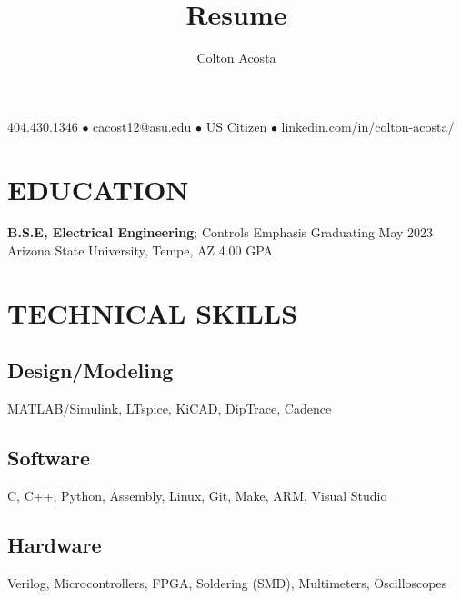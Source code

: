 \documentclass{article}
\makeatletter
\renewcommand{\maketitle}{
	\begin{center}
		{\huge\bfseries
			\theauthor}
			
		404.430.1346 $\bullet$ cacost12@asu.edu $\bullet$ US Citizen $\bullet$ linkedin.com/in/colton-acosta/
	\end{center}
}
\makeatother
\begin{document}
\title{Resume}
\author{Colton Acosta}
\maketitle
\section{EDUCATION}
\textbf{B.S.E, Electrical Engineering}; Controls Emphasis
\hfill 
Graduating May 2023
\linebreak
Arizona State University, Tempe, AZ 
\hfill
4.00 GPA

\section{TECHNICAL SKILLS}
\subsection{Design/Modeling}
MATLAB/Simulink, LTspice, KiCAD, DipTrace,  Cadence 
\subsection{Software} 
C, C++, Python, Assembly, Linux, Git, Make, ARM, Visual Studio 
\subsection{Hardware}
Verilog, Microcontrollers, FPGA, Soldering (SMD), Multimeters, Oscilloscopes 
\end{document}
